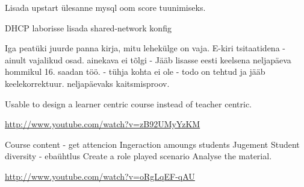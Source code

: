 Lisada upstart ülesanne mysql oom score tuunimiseks.


DHCP laborisse lisada shared-network konfig

Iga peatüki juurde panna kirja, mitu lehekülge on vaja.
E-kiri tsitaatidena - ainult vajalikud osad.
ainekava ei tõlgi - Jääb lisasse eesti keelsena
neljapäeva hommikul 16. saadan töö. - tühja kohta ei ole - todo on tehtud ja jääb keelekorrektuur.
neljapäevaks kaitsmisproov.



{\color{red} 
Usable to design a learner centric course instead of teacher centric. 

\url{http://www.youtube.com/watch?v=zB92UMyYzKM}

Course content - get attencion
Ingeraction amoungs students
Jugement 
Student diversity - ebaühtlus
Create a role played scenario
Analyse the material.

\url{http://www.youtube.com/watch?v=oRgLqEF-qAU}

}



%
